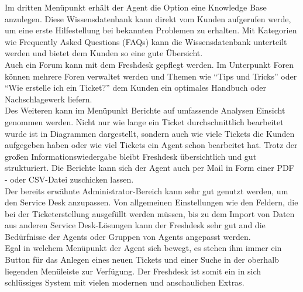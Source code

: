 Im dritten Menüpunkt erhält der Agent die Option eine Knowledge Base anzulegen. Diese Wissensdatenbank kann direkt vom Kunden aufgerufen werde, um eine erste Hilfestellung bei bekannten Problemen zu erhalten. Mit Kategorien wie Frequently Asked Questions (FAQs) kann die Wissensdatenbank unterteilt werden und bietet dem Kunden so eine gute Übersicht.\\
Auch ein Forum kann mit dem Freshdesk gepflegt werden. Im Unterpunkt Foren können mehrere Foren verwaltet werden und Themen wie \enquote{Tips und Tricks} oder \enquote{Wie erstelle ich ein Ticket?} dem Kunden ein optimales Handbuch oder Nachschlagewerk liefern.\\
Des Weiteren kann im Menüpunkt Berichte auf umfassende Analysen Einsicht genommen werden. Nicht nur wie lange ein Ticket durchschnittlich bearbeitet wurde ist in Diagrammen dargestellt, sondern auch wie viele Tickets die Kunden aufgegeben haben oder wie viel Tickets ein Agent schon bearbeitet hat. Trotz der großen Informationswiedergabe bleibt Freshdesk übersichtlich und gut strukturiert. Die Berichte kann sich der Agent auch per Mail in Form einer PDF - oder CSV-Datei zuschicken lassen.\\
Der bereits erwähnte Administrator-Bereich kann sehr gut genutzt werden, um den Service Desk anzupassen. Von allgemeinen Einstellungen wie den Feldern, die bei der Ticketerstellung ausgefüllt werden müssen, bis zu dem Import von Daten aus anderen Service Desk-Lösungen kann der Freshdesk sehr gut and die Bedürfnisse der Agents oder Gruppen von Agents angepasst werden.\\
Egal in welchem Menüpunkt der Agent sich bewegt, es stehen ihm immer ein Button für das Anlegen eines neuen Tickets und einer Suche in der oberhalb liegenden Menüleiste zur Verfügung. Der Freshdesk ist somit ein in sich schlüssiges System mit vielen modernen und anschaulichen Extras.

